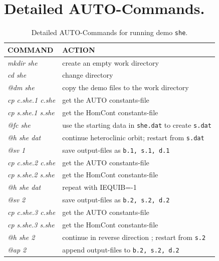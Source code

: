 \documentclass[12pt]{report}
\begin{document}
\section{ Detailed {\cal AUTO}-Commands.}
\begin{table}[htbp]
\begin{center}
\begin{tabular}{| l | l |}
\hline
  COMMAND  & ACTION \\
\hline
  {\it mkdir she} & create an empty work directory \\ 
  {\it cd she} & change directory \\
  {\it @dm she} & copy the demo files to the work directory \\
\hline
  {\it cp c.she.1 c.she} & get the AUTO constants-file \\ 
  {\it cp s.she.1 s.she} & get the HomCont constants-file \\ 
  {\it @fc she} & use the starting data in {\tt she.dat} to create {\tt s.dat} \\ 
  {\it @h she dat} &  continue heteroclinic orbit; restart from {\tt s.dat}\\ 
  {\it @sv 1} & save output-files as {\tt b.1, s.1, d.1} \\ 
\hline
  {\it cp c.she.2 c.she} & get the AUTO constants-file \\ 
  {\it cp s.she.2 s.she} & get the HomCont constants-file \\ 
  {\it @h she dat} &  repeat with IEQUIB=-1 \\ 
  {\it @sv 2} & save output-files as {\tt b.2, s.2, d.2} \\ 
\hline
  {\it cp c.she.3 c.she} & get the AUTO constants-file \\ 
  {\it cp s.she.3 s.she} &  get the HomCont constants-file \\ 
  {\it @h she 2} & continue in reverse direction ; restart from {\tt s.2} \\ 
  {\it @ap 2} & append output-files to {\tt b.2, s.2, d.2} \\ 
\hline
\end{tabular}
\caption{Detailed {\cal AUTO}-Commands for running demo {\tt she}.}
\label{tbl:demo_she_1}
\end{center}
\end{table}
\end{document}
